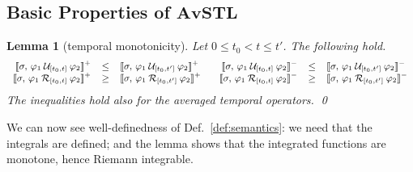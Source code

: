 \documentclass[envcountsect,orivec]{llncs} \usepackage{etex} \usepackage[]{graphicx}
\newif\ifignore \ignorefalse
\newcommand{\auxproof}[1]{
  \ifignore\mbox{}\newline
  \textbf{BEGIN: AUX-PROOF} \dotfill\newline
  {#1}\mbox{}\newline
  \textbf{END: AUX-PROOF}\dotfill\newline
  \fi}
\newtheorem{mylemma}[mytheorem]{Lemma}
\newtheorem{myremark}[mytheorem]{Remark}
\def\myqed{\qed}
\newcommand{\UntilOp}[1]{\mathbin{\mathcal{U}_{#1}}}
\newcommand{\Release}[1]{\mathbin{\mathcal{R}_{#1}}}
\newcommand{\Robust}[2]{{ \llbracket #1,\, #2 \rrbracket}}
\newcommand{\AvSTL}{\textbf{AvSTL}}
\begin{document}
\auxproof{
 \begin{myremark}
 In Def.~\ref{def:semantics},
 we define the value of positive/negative temporal robustness
 of averaged- modalities
 as a definite integral. 
 From the following Lem.~\ref{lemma:untilIsMonotone},
 we can check the integrability
 of them;
 all 
 $\Robust{\sigma}{\varphi_1 \UntilOp{[t,\tau]} \varphi_2}^{+}$,
 $\Robust{\sigma}{\varphi_1 \UntilOp{[t,\tau]} \varphi_2}^{-}$,
 $\Robust{\sigma}{\varphi_1 \Release{[t,\tau]} \varphi_2}^{+}$, and
 $\Robust{\sigma}{\varphi_1 \Release{[t,\tau]} \varphi_2}^{-}$ 
 are monotonically increasing or decreasing
 over $\tau \in [t, t']$,
 hence these functions are integrable.
\end{myremark}
}

\subsection{Basic Properties of $\AvSTL$}
\begin{mylemma}[temporal monotonicity]\label{lemma:untilIsMonotone}
  Let 
  $0 \leq t_0 < t \leq t'$. 
  The following hold.
   \[\small
    \begin{array}{rclrcl}
      \Robust{\sigma}{\varphi_1 \UntilOp{[t_0,t]} \varphi_2}^{+} 
      &\leq &
      \Robust{\sigma}{\varphi_1 \UntilOp{[t_0,t']} \varphi_2}^{+}
      \quad
      &
      \Robust{\sigma}{\varphi_1 \UntilOp{[t_0,t]} \varphi_2}^{-} 
      &\leq &
      \Robust{\sigma}{\varphi_1 \UntilOp{[t_0,t']} \varphi_2}^{-}
      \\
      \Robust{\sigma}{\varphi_1 \Release{[t_0,t]} \varphi_2}^{+} 
      &\geq&
      \Robust{\sigma}{\varphi_1 \Release{[t_0,t']} \varphi_2}^{+}
      &
      \Robust{\sigma}{\varphi_1 \Release{[t_0,t]} \varphi_2}^{-} 
      &\geq&
      \Robust{\sigma}{\varphi_1 \Release{[t_0,t']} \varphi_2}^{-}
    \end{array}
  \] 
  The inequalities hold also for the averaged temporal operators. \myqed                        
\end{mylemma}
We can now see well-definedness of Def.~\ref{def:semantics}:
we need that the integrals are defined; and the lemma shows that
the integrated functions are monotone, hence Riemann integrable.
\end{document}
